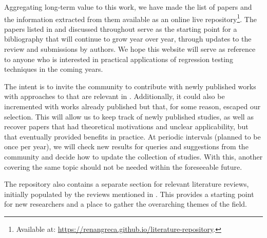 Aggregating long-term value to this work, we have made the list of papers and the information extracted from them available as an online live repository\footnote{Available at: \url{https://renangreca.github.io/literature-repository}.}.
The papers listed in  and discussed throughout  serve as the starting point for a bibliography that will continue to grow year over year, through updates to the review and submissions by authors.
We hope this website will serve as reference to anyone who is interested in practical applications of regression testing techniques in the coming years.

 
The intent is to invite the community to contribute with newly published works with approaches to \rt that are relevant in \rea.
Additionally, it could also be incremented with works already published but that, for some reason, escaped our selection.
This will allow us to keep track of newly published studies, 
as well as recover papers that had theoretical motivations and unclear applicability, but that eventually provided benefits in practice.
At periodic intervals (planned to be once per year), we will check new results for queries and suggestions from the community and decide how to update the collection of studies.
With this, another \slr covering the same topic should not be needed within the foreseeable future.

The repository also contains a separate section for relevant literature reviews, initially populated by the reviews mentioned in .
This provides a starting point for new researchers and a place to gather the overarching themes of the field.


